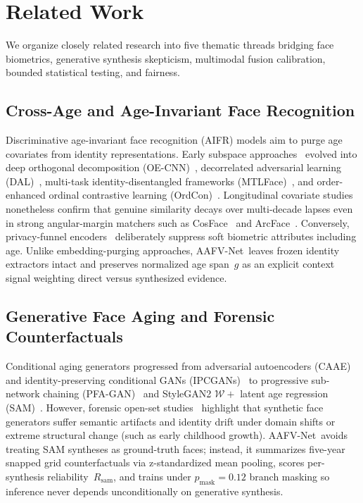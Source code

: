 \documentclass[journal]{IEEEtran}
\newcommand{\sys}{AAFV-Net}
\begin{document}
\section{Related Work}
\label{sec:related}
We organize closely related research into five thematic threads bridging face biometrics, generative synthesis skepticism, multimodal fusion calibration, bounded statistical testing, and fairness.

\subsection{Cross-Age and Age-Invariant Face Recognition}
Discriminative age-invariant face recognition (AIFR) models aim to purge age covariates from identity representations. Early subspace approaches~\cite{li2011aifr} evolved into deep orthogonal decomposition (OE-CNN)~\cite{wang2018oecnn}, decorrelated adversarial learning (DAL)~\cite{wang2019dal}, multi-task identity-disentangled frameworks (MTLFace)~\cite{huang2021mtlface}, and order-enhanced ordinal contrastive learning (OrdCon)~\cite{wang2025ordcon}. Longitudinal covariate studies~\cite{bestrowden2018longitudinal} nonetheless confirm that genuine similarity decays over multi-decade lapses even in strong angular-margin matchers such as CosFace~\cite{wang2018cosface} and ArcFace~\cite{deng2019arcface}. Conversely, privacy-funnel encoders~\cite{razeghi2026privacy} deliberately suppress soft biometric attributes including age. Unlike embedding-purging approaches, \sys\ leaves frozen identity extractors intact and preserves normalized age span~$g$ as an explicit context signal weighting direct versus synthesized evidence.

\subsection{Generative Face Aging and Forensic Counterfactuals}
Conditional aging generators progressed from adversarial autoencoders (CAAE)~\cite{zhang2017caae} and identity-preserving conditional GANs (IPCGANs)~\cite{tang2018ipcgan} to progressive sub-network chaining (PFA-GAN)~\cite{huang2021pfagan} and StyleGAN2 $\mathcal{W}+$ latent age regression (SAM)~\cite{alaluf2021sam,karras2020stylegan2}. However, forensic open-set studies~\cite{zhou2024openset} highlight that synthetic face generators suffer semantic artifacts and identity drift under domain shifts or extreme structural change (such as early childhood growth). \sys\ avoids treating SAM syntheses as ground-truth faces; instead, it summarizes five-year snapped grid counterfactuals via z-standardized mean pooling, scores per-synthesis reliability~$R_{\text{sam}}$, and trains under $p_{\text{mask}}=0.12$ branch masking so inference never depends unconditionally on generative synthesis.
\end{document}
